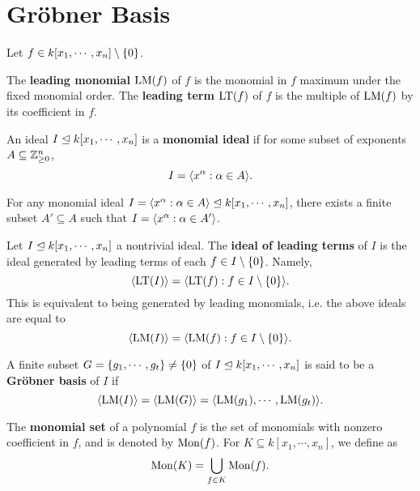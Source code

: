 \chapter{Gr{\"o}bner Basis}

Let \(f \in k[x_1, \cdots, x_n] \setminus \{ 0 \}\).

\begin{definition} %
    \label{def:LeadingMonomialTerm}
    The \textbf{leading monomial} \(\mathrm{LM}(f)\) of \(f\) is the monomial in
    \(f\) maximum under the fixed monomial order. The \textbf{leading term}
    \(\mathrm{LT}(f)\) of \(f\) is the multiple of \(\mathrm{LM}(f)\) by its
    coefficient in \(f\).
\end{definition}

\begin{definition} %
    \label{def:MonomialIdeal}
    An ideal \(I \trianglelefteq k[x_1, \cdots, x_n]\) is a \textbf{monomial ideal}
    if for some subset of exponents \(A \subseteq \mathbb{Z}_{\ge 0}^n\),
    \[I = \langle x^\alpha : \alpha \in A \rangle.\]
\end{definition}

\begin{theorem} %
    For any monomial ideal \(I = \langle x^\alpha : \alpha \in A \rangle \trianglelefteq
    k[x_1, \cdots, x_n]\), there exists a finite subset \(A' \subseteq A\)
    such that \(I = \langle x^\alpha : \alpha \in A' \rangle\).
\end{theorem}

\begin{definition} %
    Let \(I \trianglelefteq k[x_1, \cdots, x_n]\) a nontrivial ideal. The
    \textbf{ideal of leading terms} of \(I\) is the ideal generated by leading
    terms of each \(f \in I \setminus \{ 0 \}\). Namely,
    \[\langle \mathrm{LT}(I) \rangle
    = \langle \mathrm{LT}(f) : f \in I \setminus \{ 0 \} \rangle.\]
    This is equivalent to being generated by leading monomials, i.e. the above
    ideals are equal to
    \[\langle \mathrm{LM}(I) \rangle
    = \langle \mathrm{LM}(f) : f \in I \setminus \{ 0 \} \rangle.\]
\end{definition}

\begin{definition} %
    A finite subset \(G = \{ g_1, \cdots, g_t \} \ne \{ 0 \}\) of \(I \trianglelefteq
    k[x_1, \cdots, x_n]\) is said to be a \textbf{Gr{\"o}bner basis} of \(I\) if
    \[\langle \mathrm{LM}(I) \rangle = \langle \mathrm{LM}(G) \rangle
    = \langle \mathrm{LM}(g_1), \cdots, \mathrm{LM}(g_t) \rangle.\]
\end{definition}

\begin{definition}
    \label{def:MonomialSet}
    The \textbf{monomial set} of a polynomial \(f\) is the set of monomials with
    nonzero coefficient in \(f\), and is denoted by \(\mathrm{Mon}(f)\). For \(K
    \subseteq k[x_1, \cdots, x_n]\), we define as
    \[\mathrm{Mon}(K) = \bigcup_{f \in K} \mathrm{Mon}(f).\]
\end{definition}